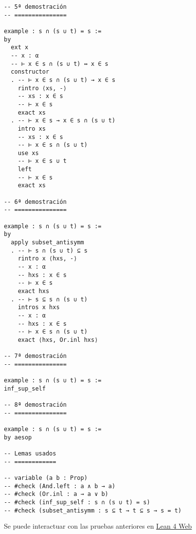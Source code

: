 \begin{verbatim}
-- 5ª demostración
-- ===============

example : s ∩ (s ∪ t) = s :=
by
  ext x
  -- x : α
  -- ⊢ x ∈ s ∩ (s ∪ t) ↔ x ∈ s
  constructor
  . -- ⊢ x ∈ s ∩ (s ∪ t) → x ∈ s
    rintro ⟨xs, -⟩
    -- xs : x ∈ s
    -- ⊢ x ∈ s
    exact xs
  . -- ⊢ x ∈ s → x ∈ s ∩ (s ∪ t)
    intro xs
    -- xs : x ∈ s
    -- ⊢ x ∈ s ∩ (s ∪ t)
    use xs
    -- ⊢ x ∈ s ∪ t
    left
    -- ⊢ x ∈ s
    exact xs

-- 6ª demostración
-- ===============

example : s ∩ (s ∪ t) = s :=
by
  apply subset_antisymm
  . -- ⊢ s ∩ (s ∪ t) ⊆ s
    rintro x ⟨hxs, -⟩
    -- x : α
    -- hxs : x ∈ s
    -- ⊢ x ∈ s
    exact hxs
  . -- ⊢ s ⊆ s ∩ (s ∪ t)
    intros x hxs
    -- x : α
    -- hxs : x ∈ s
    -- ⊢ x ∈ s ∩ (s ∪ t)
    exact ⟨hxs, Or.inl hxs⟩

-- 7ª demostración
-- ===============

example : s ∩ (s ∪ t) = s :=
inf_sup_self

-- 8ª demostración
-- ===============

example : s ∩ (s ∪ t) = s :=
by aesop

-- Lemas usados
-- ============

-- variable (a b : Prop)
-- #check (And.left : a ∧ b → a)
-- #check (Or.inl : a → a ∨ b)
-- #check (inf_sup_self : s ∩ (s ∪ t) = s)
-- #check (subset_antisymm : s ⊆ t → t ⊆ s → s = t)
\end{verbatim}
Se puede interactuar con las pruebas anteriores en \href{https://lean.math.hhu.de/\#url=https://raw.githubusercontent.com/jaalonso/Calculemus2/main/src/Interseccion\_con\_su\_union.lean}{Lean 4 Web}

